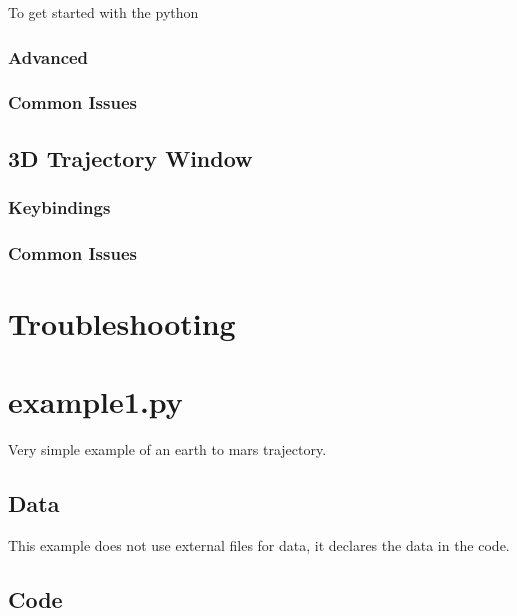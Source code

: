 \documentclass[a4paper,11pt]{article}
\begin{document}
To get started with the python


\subsubsection{Advanced}


\subsubsection{Common Issues}


\subsection{3D Trajectory Window}


\subsubsection{Keybindings}


\subsubsection{Common Issues}


\section{Troubleshooting}


\appendix

\newpage
\section{example1.py}
Very simple example of an earth to mars trajectory.
\subsection{Data}
This example does not use external files for data, it declares the data in the code.
\subsection{Code}

\end{document}
